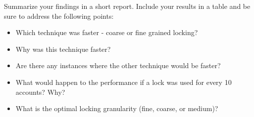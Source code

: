 \documentclass[letterpaper,10pt]{article}
\begin{document}
Summarize your findings in a short report. Include your results in a table and be sure to address the
following points:
\begin{itemize}
\item Which technique was faster - coarse or fine grained locking?
\item Why was this technique faster?
\item Are there any instances where the other technique would be faster?
\item What would happen to the performance if a lock was used for every 10 accounts? Why?
\item What is the optimal locking granularity (fine, coarse, or medium)?
\end{itemize}
\end{document}
